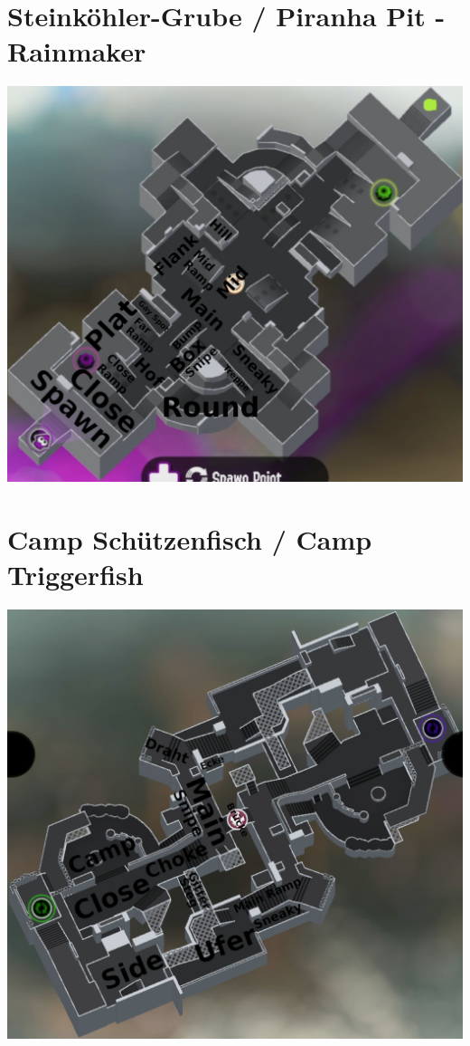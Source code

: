 \documentclass{scrreprt}
\begin{document}
\section{Steinköhler-Grube / Piranha Pit - Rainmaker}
\includegraphics[width=\linewidth]{img/piranhapit-rainmaker.png}
\section{Camp Schützenfisch / Camp Triggerfish}
\includegraphics[width=\linewidth]{img/camptriggerfish.png}
\end{document}
